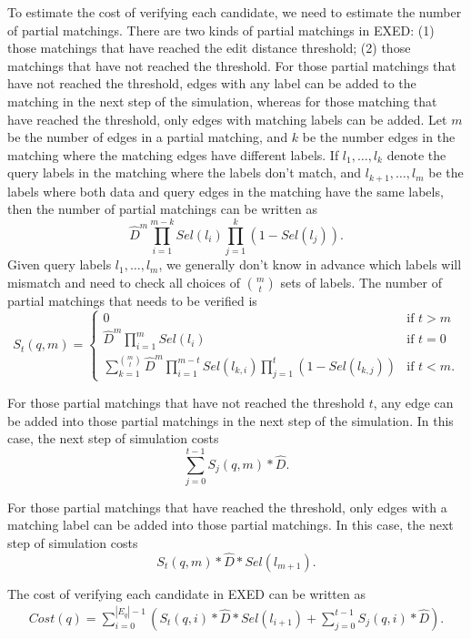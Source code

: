 \documentclass{sigmod}
\begin{document}
To estimate the cost of verifying each candidate, we need to estimate the number of partial matchings.
There are two kinds of partial matchings in EXED: (1) those matchings that have reached the edit distance threshold; (2) those matchings that have not reached the threshold. For those partial matchings that have not reached the threshold, edges with any label can be added to the matching in the next step of the simulation, whereas for those matching that have reached the threshold, only edges with matching labels can be added. Let $m$ be the number of edges in a partial matching, and $k$ be the number edges in the matching where the matching edges have different labels. If $l_1, \ldots, l_k$ denote the query labels in the matching where the labels don't match, and $l_{k+1}, \ldots, l_m$ be the
labels where both data and query edges in the matching have the same labels,
then the number of partial matchings can be written as
\[
\hat{D}^m \prod\limits_{i=1}^{m-k}Sel(l_i)\prod\limits_{j=1}^{k}(1-Sel(l_j)).
\]
Given query labels $l_1, \ldots, l_m$, we generally don't know in advance which labels will mismatch and need to check all choices of ${m \choose t}$ sets of labels. The number of partial matchings that needs to be verified is 
\begin{equation}
\label{eq:st-cases}
    S_t(q,m)= 
\begin{cases}
    0         			  & \text{if } t > m\\
    \hat{D}^m\prod\limits_{i=1}^{m}Sel(l_i) & \text{if }t=0\\
    \sum\limits_{k=1}^{m \choose t}\hat{D}^m \prod\limits_{i=1}^{m-t}Sel(l_{k,i})\prod\limits_{j=1}^t(1-Sel(l_{k,j}))& \text{if } t < m.
\end{cases}
\end{equation}

For those partial matchings that have not reached the threshold $t$, any edge can be added into those partial matchings in the next step of the simulation. In this case, the next step of simulation costs
\[
\sum\limits_{j=0}^{t-1}S_j(q,m) * \hat{D}.
\]

For those partial matchings that have reached the threshold, only edges with a matching label can be added into those partial matchings. In this case, the next step of simulation costs
\[
S_t(q,m) * \hat{D} * Sel(l_{m+1}).
\]

The cost of verifying each candidate in  EXED can be written as
\begin{align}
\label{eq:ed-verify}
Cost(q) = \sum\limits_{i=0}^{|E_q|-1}(S_t(q,i) * \hat{D} *  Sel(l_{i+1}) + \sum\limits_{j=0}^{t-1}S_j(q,i) * \hat{D}).
\end{align}
\end{document}
